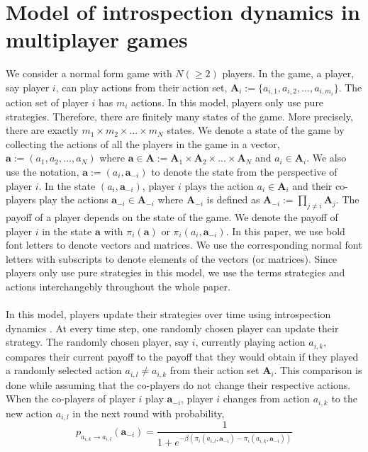 \documentclass[11pt]{article}
\theoremstyle{plainCl1}
\theoremstyle{plainCl2}
\newcommand{\A}{\mathbf{A}}
\newcommand{\abf}{\mathbf{a}}
\begin{document}
\section*{Model of introspection dynamics in multiplayer games}
We consider a normal form game with $N (\geq 2)$ players. In the game, a player, say player $i$, can play actions from their action set, $\A_i := \{a_{i,1}, a_{i,2}, ..., a_{i,m_i} \}$. The action set of player $i$ has $m_i$ actions. In this model, players only use pure strategies. Therefore, there are finitely many states of the game. More precisely, there are exactly $m_1 \times m_2 \times ... \times m_N$ states. We denote a state of the game by collecting the actions of all the players in the game in a vector, $\abf := (a_1, a_2, ..., a_N)$ where $\abf \in \A := \A_1 \times \A_2 \times ... \times \A_N$ and $a_i \in \A_i$. We also use the notation, $\abf := (a_i, \abf_{-i})$ to denote the state from the perspective of player $i$. In the state $(a_i, \abf_{-i})$, player $i$ plays the action $a_i \in \A_i$ and their co-players play the actions $\abf_{-i} \in \A_{-i}$ where $\A_{-i}$ is defined as $\A_{-i}:= \prod_{j \neq i} \A_j$. The payoff of a player depends on the state of the game. We denote the payoff of player $i$ in the state $\abf$ with $\pi_i(\abf)$ or $\pi_i(a_i, \abf_{-i})$. In this paper, we use bold font letters to denote vectors and matrices. We use the corresponding normal font letters with subscripts to denote elements of the vectors (or matrices). Since players only use pure strategies in this model, we use the terms strategies and actions interchangebly throughout the whole paper. \\ \\ 
\noindent In this model, players update their strategies over time using introspection dynamics \cite{Couto:NJP:2022}. At every time step, one randomly chosen player can update their strategy. The randomly chosen player, say $i$, currently playing  action $a_{i,k}$, compares their current payoff to the payoff that they would obtain if they played a randomly selected action $a_{i,l} \neq a_{i,k}$ from their action set $\A_i$. This comparison is done while assuming that the co-players do not change their respective actions. When the co-players of player $i$ play $\abf_{-i}$, player $i$ changes from action $a_{i,k}$ to the new action $a_{i,l}$ in the next round with probability, \\
\begin{equation}
 p_{a_{i,k} \to a_{i,l}} (\abf_{-i})= \frac{1}{1 + e^{\displaystyle -\beta(\pi_i(a_{i,l}, \abf_{-i}) - \pi_i(a_{i,k}, \abf_{-i}))}}
 \label{Eq:introspection-update}
\end{equation}
\end{document}

